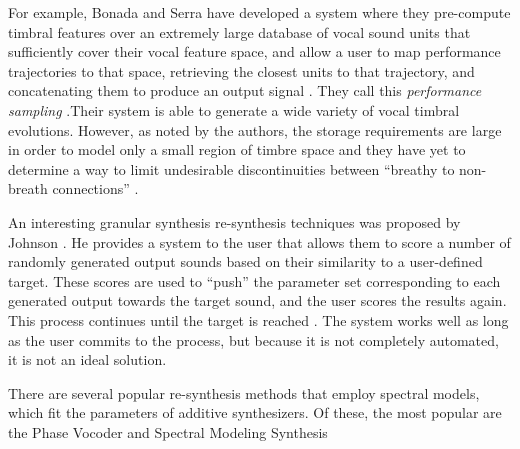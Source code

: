 \documentclass[a4paper,12pt]{report} 	%
\numberwithin{figure}{chapter}
\numberwithin{table}{chapter}
\numberwithin{equation}{chapter}
\begin{document}
\begin{flushleft}
For example, Bonada and Serra have developed a system where they pre-compute timbral features over an extremely large database of vocal sound units that sufficiently cover their vocal feature space, and allow a user to map performance trajectories to that space, retrieving the closest units to that trajectory, and concatenating them to produce an output signal \cite{Bonada:2007bs}. They call this \emph{performance sampling} \cite[p. 67]{Bonada:2007bs}.Their system is able to generate a wide variety of vocal timbral evolutions. However, as noted by the authors, the storage requirements are large in order to model only a small region of timbre space and they have yet to determine a way to limit undesirable discontinuities between ``breathy to non-breath connections'' \cite[p. 78]{Bonada:2007bs}.

An interesting granular synthesis re-synthesis techniques was proposed by Johnson \cite{Johnson:1998sh}. He provides a system to the user that allows them to score a number of randomly generated output sounds based on their similarity to a user-defined target. These scores are used to ``push'' the parameter set corresponding to each generated output towards the target sound, and the user scores the results again. This process continues until the target is reached  \cite[p. 2]{Johnson:1998sh}. The system works well as long as the user commits to the process, but because it is not completely automated, it is not an ideal solution.

There are several popular re-synthesis methods that employ spectral models, which fit the parameters of additive synthesizers. Of these, the most popular are the Phase Vocoder and Spectral Modeling Synthesis


\end{flushleft}
\end{document}

